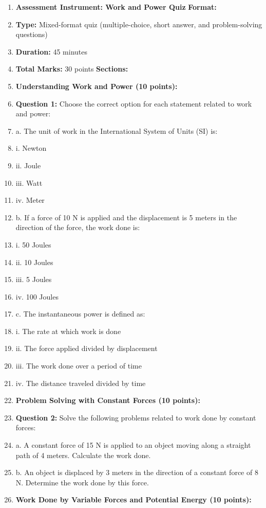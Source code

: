\begin{enumerate}
    \item \textbf{Assessment Instrument: Work and Power Quiz} \textbf{Format:}
    \item \textbf{Type:} Mixed-format quiz (multiple-choice, short answer, and problem-solving questions)
    \item \textbf{Duration:} 45 minutes
    \item \textbf{Total Marks:} 30 points \textbf{Sections:}
    \item \textbf{Understanding Work and Power (10 points):}
    \item \textbf{Question 1:} Choose the correct option for each statement related to work and power:
    \item a. The unit of work in the International System of Units (SI) is:
    \item i. Newton
    \item ii. Joule
    \item iii. Watt
    \item iv. Meter
    \item b. If a force of 10 N is applied and the displacement is 5 meters in the direction of the force, the work done is:
    \item i. 50 Joules
    \item ii. 10 Joules
    \item iii. 5 Joules
    \item iv. 100 Joules
    \item c. The instantaneous power is defined as:
    \item i. The rate at which work is done
    \item ii. The force applied divided by displacement
    \item iii. The work done over a period of time
    \item iv. The distance traveled divided by time
    \item \textbf{Problem Solving with Constant Forces (10 points):}
    \item \textbf{Question 2:} Solve the following problems related to work done by constant forces:
    \item a. A constant force of 15 N is applied to an object moving along a straight path of 4 meters. Calculate the work done.
    \item b. An object is displaced by 3 meters in the direction of a constant force of 8 N. Determine the work done by this force.
    \item \textbf{Work Done by Variable Forces and Potential Energy (10 points):}

\end{enumerate}
